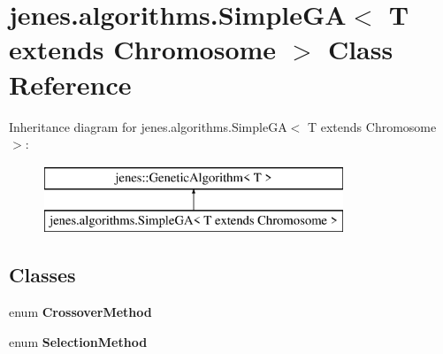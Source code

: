 \hypertarget{classjenes_1_1algorithms_1_1_simple_g_a_3_01_t_01extends_01_chromosome_01_4}{\section{jenes.\-algorithms.\-Simple\-G\-A$<$ T extends Chromosome $>$ Class Reference}
\label{classjenes_1_1algorithms_1_1_simple_g_a_3_01_t_01extends_01_chromosome_01_4}
}
Inheritance diagram for jenes.\-algorithms.\-Simple\-G\-A$<$ T extends Chromosome $>$\-:\begin{figure}[H]
\begin{center}
\leavevmode
\includegraphics[height=2.000000cm]{classjenes_1_1algorithms_1_1_simple_g_a_3_01_t_01extends_01_chromosome_01_4}
\end{center}
\end{figure}
\subsection*{Classes}
\begin{DoxyCompactItemize}
\item 
enum {\bfseries Crossover\-Method}
\item 
enum {\bfseries Selection\-Method}
\end{DoxyCompactItemize}
